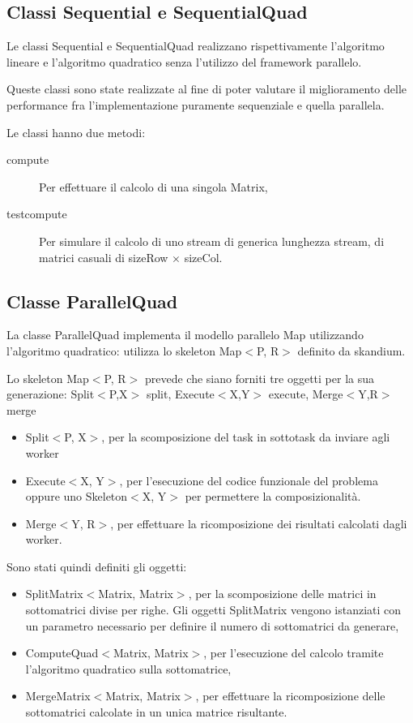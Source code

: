 \documentclass[a4paper,10pt]{article}
\begin{document}
\subsection{Classi \textsf{Sequential} e \textsf{SequentialQuad}}
\label{c:sequential}

Le classi \textsf{Sequential} e \textsf{SequentialQuad} realizzano rispettivamente l'algoritmo lineare e l'algoritmo quadratico senza l'utilizzo del framework parallelo.

Queste classi sono state realizzate al fine di poter valutare il miglioramento delle performance fra l'implementazione puramente sequenziale e quella parallela.

Le classi hanno due metodi:
\begin{description}
\item[\textsf{compute}] Per effettuare il calcolo di una singola \textsf{Matrix},
\item[\textsf{testcompute}] Per simulare il calcolo di uno stream di generica lunghezza \textsf{stream}, di matrici casuali di \textsf{sizeRow} $\times$ \textsf{sizeCol}.
\end{description}

\subsection{Classe \textsf{ParallelQuad}}
\label{c:parquad}

La classe \textsf{ParallelQuad} implementa il modello parallelo \textsf{Map} utilizzando l'algoritmo quadratico: utilizza lo skeleton \textsf{Map$<$P, R$>$} definito da skandium.

Lo skeleton \textsf{Map$<$P, R$>$} prevede che siano forniti tre oggetti per la sua generazione: \textsf{Split$<$P,X$>$ split, Execute$<$X,Y$>$ execute, Merge$<$Y,R$>$ merge}
\begin{itemize}
\item \textsf{Split$<$P, X$>$}, per la scomposizione del task in sottotask da inviare agli worker
\item \textsf{Execute$<$X, Y$>$}, per l'esecuzione del codice funzionale del problema oppure uno Skeleton$<$X, Y$>$ per permettere la composizionalit\`a.
\item \textsf{Merge$<$Y, R$>$}, per effettuare la ricomposizione dei risultati calcolati dagli worker.
\end{itemize}

Sono stati quindi definiti gli oggetti:
\begin{itemize}
\item \textsf{SplitMatrix$<$Matrix, Matrix$>$}, per la scomposizione delle matrici in sottomatrici divise per righe. Gli oggetti \textsf{SplitMatrix} vengono istanziati con un parametro necessario per definire il numero di sottomatrici da generare,
\item \textsf{ComputeQuad$<$Matrix, Matrix$>$}, per l'esecuzione del calcolo tramite l'algoritmo quadratico sulla sottomatrice,
\item \textsf{MergeMatrix$<$Matrix, Matrix$>$}, per effettuare la ricomposizione delle sottomatrici calcolate in un unica matrice risultante.
\end{itemize}
\end{document}
